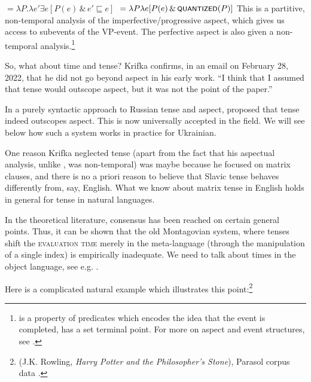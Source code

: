 \documentclass[output=paper,colorlinks,citecolor=brown]{langscibook}
\begin{document}
\ea \ea {}${}=\lambda P. \lambda e' \exists e [P(e) \, \& \,
e' \sqsubseteq e] $ \hfill\citep[47]{Krifka1992}  
\ex\label{krifka-pf}  ${}=\lambda P \lambda e  [P(e) \,
\& \, \cnst{Quantized}(P)] $ \hfill\citep[50]{Krifka1992}
\z\z
This is a partitive, non-temporal analysis of the imperfective/progressive aspect, which gives us access to subevents of the VP-event. The perfective aspect is also given a non-temporal analysis.\footnote{ is a property of predicates which encodes the idea that the event is completed, has a set terminal point. For more on aspect and event structures, see .}

So, what about time and tense? Krifka confirms, in an email on February 28, 2022, that he did not go beyond aspect in his early work. ``I think that I assumed that tense would outscope aspect, but it was not the point of the paper.” 

In a purely syntactic approach to Russian tense and aspect, \citet{yadroff96} proposed that tense indeed outscopes aspect. This is now universally accepted in the field. We will see below how such a system works in practice for Ukrainian.

One reason Krifka neglected tense (apart from the fact that his aspectual analysis, unlike \citealt{Klein1995}, was non-temporal) was maybe because he focused on matrix clauses, and there is no a priori reason to believe that Slavic tense behaves differently from, say, English. What we know about matrix tense in English holds in general for tense in natural languages.

In the theoretical literature, consensus has been reached on certain general points.
Thus, it can be shown that the old Montagovian system, where tenses shift the \textsc{evaluation time} merely in the meta-language (through the manipulation of a single index) is empirically inadequate. We need to talk about times in the object language, see e.g. \citet{Kusumoto2005}.

Here is a complicated natural example which illustrates this point:\footnote{(J.K. Rowling, \textit{Harry Potter and the Philosopher's Stone}), Parasol corpus data \citep{parasol}.}
\end{document}
